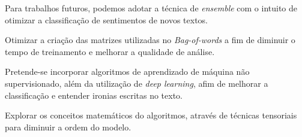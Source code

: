 Para trabalhos futuros, podemos adotar a técnica de \textit{ensemble}
com o intuito de otimizar a classificação de sentimentos de novos textos. 

Otimizar a criação das matrizes utilizadas no \textit{Bag-of-words} a fim de diminuir 
o tempo de treinamento e melhorar a qualidade de análise.

Pretende-se incorporar algoritmos de aprendizado de máquina não supervisionado, além da 
utilização de \textit{deep learning}, afim de melhorar a classificação e entender ironias escritas 
no texto.

Explorar os conceitos matemáticos do algoritmos, através de técnicas tensoriais para diminuir a ordem do modelo.